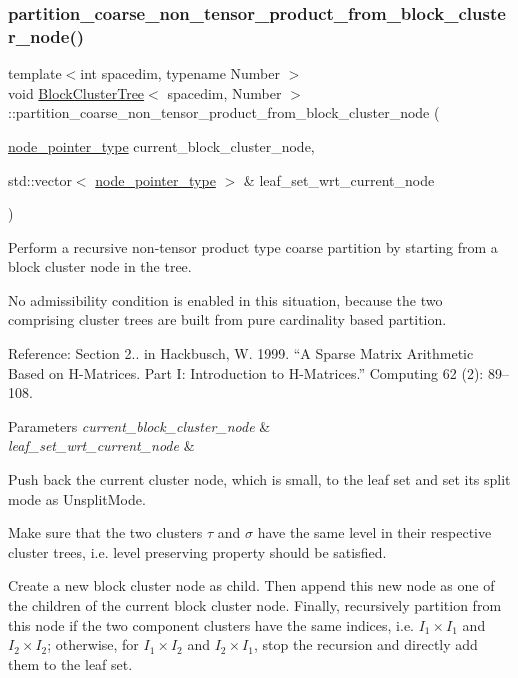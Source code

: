 \subsubsection{\texorpdfstring{partition\+\_\+coarse\+\_\+non\+\_\+tensor\+\_\+product\+\_\+from\+\_\+block\+\_\+cluster\+\_\+node()}{partition\_coarse\_non\_tensor\_product\_from\_block\_cluster\_node()}}
{\footnotesize\ttfamily template$<$int spacedim, typename Number $>$ \\
void \hyperlink{classBlockClusterTree}{Block\+Cluster\+Tree}$<$ spacedim, Number $>$\+::partition\+\_\+coarse\+\_\+non\+\_\+tensor\+\_\+product\+\_\+from\+\_\+block\+\_\+cluster\+\_\+node (\begin{DoxyParamCaption}\item[{\hyperlink{classTreeNode}{node\+\_\+pointer\+\_\+type}}]{current\+\_\+block\+\_\+cluster\+\_\+node,  }\item[{std\+::vector$<$ \hyperlink{classTreeNode}{node\+\_\+pointer\+\_\+type} $>$ \&}]{leaf\+\_\+set\+\_\+wrt\+\_\+current\+\_\+node }\end{DoxyParamCaption})\hspace{0.3cm}{\ttfamily [private]}}

Perform a recursive non-\/tensor product type coarse partition by starting from a block cluster node in the tree.

No admissibility condition is enabled in this situation, because the two comprising cluster trees are built from pure cardinality based partition.

Reference\+: Section 2.. in Hackbusch, W. 1999. “A Sparse Matrix Arithmetic Based on H-\/\+Matrices. Part I\+: Introduction to H-\/\+Matrices.” Computing 62 (2)\+: 89–108. 
\begin{DoxyParams}{Parameters}
{\em current\+\_\+block\+\_\+cluster\+\_\+node} & \\
\hline
{\em leaf\+\_\+set\+\_\+wrt\+\_\+current\+\_\+node} & \\
\hline
\end{DoxyParams}
Push back the current cluster node, which is small, to the leaf set and set its split mode as {\ttfamily Unsplit\+Mode}.

Make sure that the two clusters $\tau$ and $\sigma$ have the same level in their respective cluster trees, i.\+e. level preserving property should be satisfied.

Create a new block cluster node as child. Then append this new node as one of the children of the current block cluster node. Finally, recursively partition from this node if the two component clusters have the same indices, i.\+e. $I_1 \times I_1$ and $I_2 \times I_2$; otherwise, for $I_1 \times I_2$ and $I_2 \times I_1$, stop the recursion and directly add them to the leaf set.

